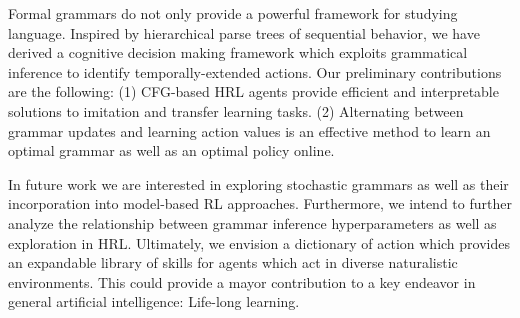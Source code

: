 \documentclass[10pt,letterpaper]{article}
\begin{document}
Formal grammars do not only provide a powerful framework for studying language. Inspired by hierarchical parse trees of sequential behavior, we have derived a cognitive decision making framework which exploits grammatical inference to identify temporally-extended actions.
Our preliminary contributions are the following:
%
(1) CFG-based HRL agents provide efficient and interpretable solutions to imitation and transfer learning tasks.
%
(2) Alternating between grammar updates and learning action values is an effective method to learn an optimal grammar as well as an optimal policy online.

In future work we are interested in exploring stochastic grammars as well as their incorporation into model-based RL approaches. Furthermore, we intend to further analyze the relationship between grammar inference hyperparameters as well as exploration in HRL.
Ultimately, we envision a dictionary of action which provides an expandable library of skills for agents which act in diverse naturalistic environments. This could provide a mayor contribution to a key endeavor in general artificial intelligence: Life-long learning.

\newpage


\setlength{\bibleftmargin}{.125in}
\setlength{\bibindent}{-\bibleftmargin}


\end{document}

